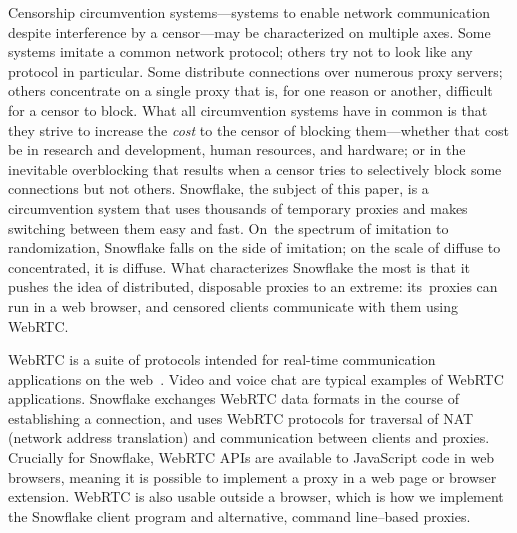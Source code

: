 \documentclass[letterpaper,twocolumn]{article}
\begin{document}
Censorship circumvention systems---systems
to enable network communication
despite interference by a censor---may
be characterized on multiple axes.
Some systems imitate a common network protocol;
others try
not to look like any protocol in particular.
Some distribute connections over numerous proxy servers;
others concentrate on a single proxy
that is, for one reason or another, difficult for a censor to block.
What all circumvention systems have in common
is that they strive to increase the \emph{cost}
to the censor of blocking them---whether that cost be in
research and development, human resources, and hardware;
or in the inevitable overblocking that results
when a censor tries to selectively block
some connections but not others.
Snowflake, the subject of this paper,
is a circumvention system that
uses thousands of temporary proxies
and makes switching between them easy and fast.
On~the spectrum of imitation to randomization,
Snowflake falls on the side of imitation;
on the scale of diffuse to concentrated, it is diffuse.
What characterizes Snowflake the most is that
it pushes the idea of distributed, disposable
proxies to an extreme:
its~proxies can run in a web browser,
and censored clients communicate with them using WebRTC.

WebRTC is a suite of protocols
intended for real-time communication applications
on the web~\cite{rfc8825}.
Video and voice chat are typical examples
of WebRTC applications.
Snowflake exchanges WebRTC data formats
in the course of establishing a connection,
and uses WebRTC protocols for traversal of NAT (network address translation)
and communication between clients and proxies.
Crucially for Snowflake, WebRTC APIs
are available to JavaScript code in web browsers,
meaning it is possible to implement a proxy
in a web page or browser extension.
WebRTC is also usable outside a browser,
which is how we implement the Snowflake client program
and alternative, command line--based proxies.
\end{document}
